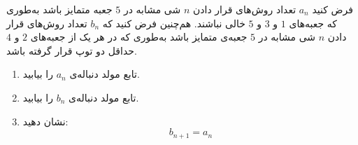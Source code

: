 \EXERCISE
فرض کنید
$a_n$
تعداد روش‌های قرار دادن
$n$
شی مشابه در
$5$
جعبه متمایز باشد به‌طوری که جعبه‌های
$1$
و
$3$
و
$5$
خالی نباشند. هم‌چنین فرض کنید که
$b_n$
تعداد روش‌های قرار دادن
$n$
شی مشابه در
$5$
جعبه‌ی متمایز باشد به‌طوری که در هر یک از جعبه‌های
$2$
و
$4$
حداقل دو توپ قرار گرفته باشد.
\begin{enumerate}
\item
تابع مولد دنباله‌ی
$a_n$
را بیابید.
\item
تابع مولد دنباله‌ی
$b_n$
را بیابید.
\item
نشان دهید:
$$b_{n+1} = a_n$$
\end{enumerate}